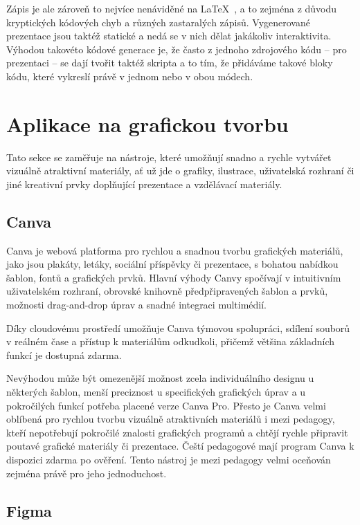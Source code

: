 Zápis je ale zároveň to nejvíce nenáviděné na \LaTeX~\cite{latex_reddit}, a to zejména z důvodu kryptických kódových chyb a různých zastaralých zápisů.
Vygenerované prezentace jsou taktéž statické a nedá se v nich dělat jakákoliv interaktivita. 
Výhodou takovéto kódové generace je, že často z jednoho zdrojového kódu -- pro prezentaci -- se dají tvořit taktéž skripta a to tím, že přidáváme takové bloky kódu, které vykreslí právě v jednom nebo v obou módech.

\section{Aplikace na grafickou tvorbu}

Tato sekce se zaměřuje na nástroje, které umožňují snadno a rychle vytvářet vizuálně atraktivní materiály, ať už jde o grafiky, ilustrace, uživatelská rozhraní či jiné kreativní prvky doplňující prezentace a vzdělávací materiály.

\subsection{Canva}\label{text:canva}

Canva je webová platforma pro rychlou a snadnou tvorbu grafických materiálů, jako jsou plakáty, letáky, sociální příspěvky či prezentace, s bohatou nabídkou šablon, fontů a grafických prvků. 
Hlavní výhody Canvy spočívají v intuitivním uživatelském rozhraní, obrovské knihovně předpřipravených šablon a prvků, možnosti drag-and-drop úprav a snadné integraci multimédií.

Díky cloudovému prostředí umožňuje Canva týmovou spolupráci, sdílení souborů v reálném čase a přístup k materiálům odkudkoli, přičemž většina základních funkcí je dostupná zdarma. 

Nevýhodou může být omezenější možnost zcela individuálního designu u některých šablon, menší preciznost u specifických grafických úprav a u pokročilých funkcí potřeba placené verze Canva Pro. 
Přesto je Canva velmi oblíbená pro rychlou tvorbu vizuálně atraktivních materiálů i mezi pedagogy, kteří nepotřebují pokročilé znalosti grafických programů a chtějí rychle připravit poutavé grafické materiály či prezentace.
Čeští pedagogové mají program Canva k dispozici zdarma po ověření. Tento nástroj je mezi pedagogy velmi oceňován zejména právě pro jeho jednoduchost.

\subsection{Figma}\label{text:figma_popis}


